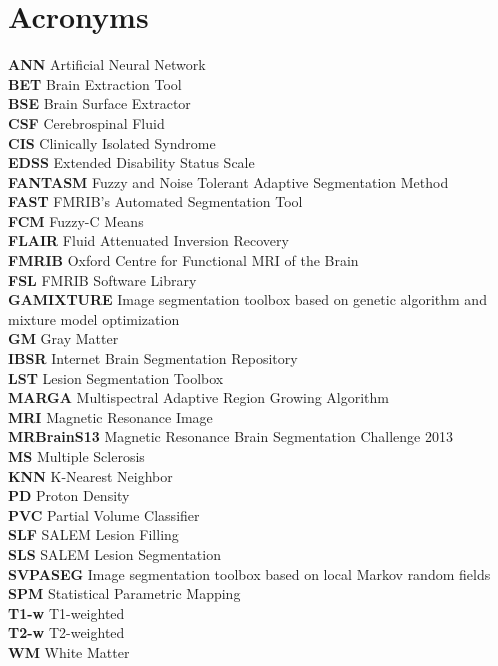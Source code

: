
\chapter*{Acronyms}

\textbf{ANN} Artificial Neural Network\\
\textbf{BET} Brain Extraction Tool\\
\textbf{BSE} Brain Surface Extractor\\
\textbf{CSF} Cerebrospinal Fluid\\
\textbf{CIS} Clinically Isolated Syndrome\\
\textbf{EDSS} Extended Disability Status Scale\\
\textbf{FANTASM} Fuzzy and Noise Tolerant Adaptive Segmentation Method\\
\textbf{FAST} FMRIB's Automated Segmentation Tool\\
\textbf{FCM} Fuzzy-C Means \\
\textbf{FLAIR} Fluid Attenuated Inversion Recovery\\
\textbf{FMRIB} Oxford Centre for Functional MRI of the Brain \\
\textbf{FSL} FMRIB Software Library\\
\textbf{GAMIXTURE} Image segmentation toolbox based on genetic algorithm and mixture model optimization\\
\textbf{GM} Gray Matter\\
\textbf{IBSR} Internet Brain Segmentation Repository\\
\textbf{LST} Lesion Segmentation Toolbox\\
\textbf{MARGA} Multispectral Adaptive Region Growing Algorithm \\
\textbf{MRI} Magnetic Resonance Image\\
\textbf{MRBrainS13} Magnetic Resonance Brain Segmentation Challenge 2013\\
\textbf{MS} Multiple Sclerosis\\
\textbf{KNN} K-Nearest Neighbor \\
\textbf{PD} Proton Density\\
\textbf{PVC} Partial Volume Classifier \\
\textbf{SLF} SALEM Lesion Filling \\
\textbf{SLS} SALEM Lesion Segmentation \\
\textbf{SVPASEG} Image segmentation toolbox based on local Markov random fields\\
\textbf{SPM} Statistical Parametric Mapping\\
\textbf{T1-w} T1-weighted\\
\textbf{T2-w} T2-weighted\\
\textbf{WM} White Matter
